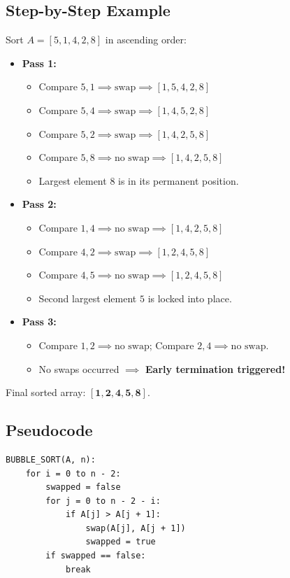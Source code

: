 \subsection{Step-by-Step Example}
Sort $A = [5, 1, 4, 2, 8]$ in ascending order:
\begin{itemize}
    \item \textbf{Pass 1:}
    \begin{itemize}
        \item Compare $5, 1 \implies \text{swap} \implies [1, 5, 4, 2, 8]$
        \item Compare $5, 4 \implies \text{swap} \implies [1, 4, 5, 2, 8]$
        \item Compare $5, 2 \implies \text{swap} \implies [1, 4, 2, 5, 8]$
        \item Compare $5, 8 \implies \text{no swap} \implies [1, 4, 2, 5, 8]$
        \item Largest element $8$ is in its permanent position.
    \end{itemize}
    \item \textbf{Pass 2:}
    \begin{itemize}
        \item Compare $1, 4 \implies \text{no swap} \implies [1, 4, 2, 5, 8]$
        \item Compare $4, 2 \implies \text{swap} \implies [1, 2, 4, 5, 8]$
        \item Compare $4, 5 \implies \text{no swap} \implies [1, 2, 4, 5, 8]$
        \item Second largest element $5$ is locked into place.
    \end{itemize}
    \item \textbf{Pass 3:}
    \begin{itemize}
        \item Compare $1, 2 \implies \text{no swap}$; Compare $2, 4 \implies \text{no swap}$.
        \item No swaps occurred $\implies$ \textbf{Early termination triggered!}
    \end{itemize}
\end{itemize}
Final sorted array: $\mathbf{[1, 2, 4, 5, 8]}$.

\subsection{Pseudocode}

\begin{lstlisting}[style=pseudocode, caption={Optimized Bubble Sort Pseudocode.}]
BUBBLE_SORT(A, n):
    for i = 0 to n - 2:
        swapped = false
        for j = 0 to n - 2 - i:
            if A[j] > A[j + 1]:
                swap(A[j], A[j + 1])
                swapped = true
        if swapped == false:
            break
\end{lstlisting}


